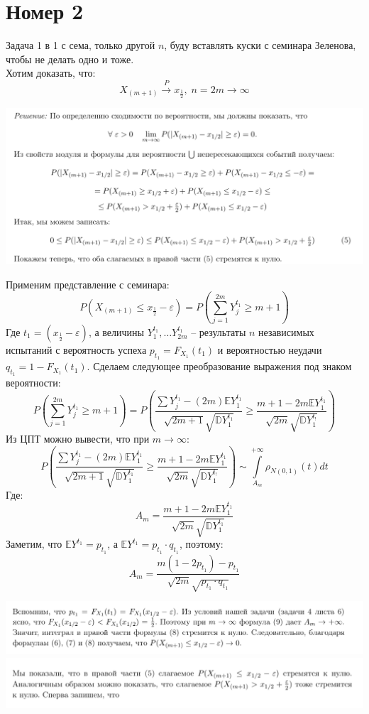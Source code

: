 \documentclass[a4paper,12pt]{article}
\begin{document}
\section*{Номер 2}
Задача 1 в 1 с сема, только другой $n$, буду вставлять куски с семинара Зеленова, чтобы не делать одно и тоже.
\\
Хотим доказать, что:
\[
X_{(m + 1) } \overset{P}{\longrightarrow} x_{\frac12}, \; n = 2m \rightarrow \infty 
\]
\begin{center}
\includegraphics[scale=0.4]{1.png}
\end{center}
Применим представление с семинара:
\[
P \left(
X_{(m + 1)} \leq x_{\frac12} - \varepsilon \right) = 
P \left( 
\sum_{j = 1}^{2m} Y_{j}^{t_1} \geq m + 1
\right)
\]
Где $t_1 = (x_{\frac12} - \varepsilon)$, а величины $Y_1^{t_1}, \ldots Y_{2m}^{t_1}$ -- результаты $n$ независимых испытаний с вероятность успеха $p_{t_1} = F_{X_1}(t_1)$ и вероятностью неудачи $q_{t_1} = 1 - F_{X_1} (t_1)$. Сделаем следующее преобразование выражения под знаком вероятности:
\[
P \left( 
\sum_{j = 1}^{2m} Y_{j}^{t_1} \geq m + 1
\right) = P \left(
\frac{\sum Y_j^{t_1} -(2m) \mathbb{E}Y_1^{t_1}}{\sqrt{2m + 1} \sqrt{\mathbb{D}Y_1^{t_1}}}
\geq \frac{m + 1- 2m \mathbb{E} Y_1^{t_1}}{\sqrt{2m} \sqrt{\mathbb{D}Y_1^{t_!}}}
\right)  
\]
Из ЦПТ можно вывести, что при $m \rightarrow \infty$:
\[
P \left(
\frac{\sum Y_j^{t_1} -(2m) \mathbb{E}Y_1^{t_1}}{\sqrt{2m + 1} \sqrt{\mathbb{D}Y_1^{t_1}}}
\geq \frac{m + 1- 2m \mathbb{E} Y_1^{t_1}}{\sqrt{2m} \sqrt{\mathbb{D}Y_1^{t_!}}}
\right)   
\sim \int\limits_{A_m}^{+\infty} \rho_{N(0, 1)} (t) dt
\]
Где:
\[
A_m = \frac{m + 1 - 2m \mathbb{E}Y_1^{t_1}}{\sqrt{2m} \sqrt{\mathbb{D} Y_1^{t_1}}} 
\]
Заметим, что $\mathbb{E} Y^{t_1} = p_{t_1}$, а $\mathbb{E} Y^{t_1} = p_{t_1} \cdot q_{t_1}$, поэтому:
\[
A_m = \frac{m(1 - 2p_{t_1}) - p_{t_1}}{\sqrt{2m} \sqrt{p_{t_1} \cdot q_{t_1}}}
\]
\begin{center}
\includegraphics[scale=0.7]{2.png}
\includegraphics[scale=0.5]{3.png}
\end{center}
\end{document}
